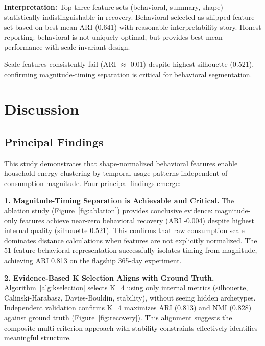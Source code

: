 \documentclass[11pt,a4paper]{article}
\begin{document}
\textbf{Interpretation:} Top three feature sets (behavioral, summary, shape) statistically indistinguishable in recovery. Behavioral selected as shipped feature set based on best mean ARI (0.641) with reasonable interpretability story. Honest reporting: behavioral is not uniquely optimal, but provides best mean performance with scale-invariant design.

Scale features consistently fail (ARI $\approx$ 0.01) despite highest silhouette (0.521), confirming magnitude-timing separation is critical for behavioral segmentation.

\section{Discussion}
\label{sec:discussion}

\subsection{Principal Findings}

This study demonstrates that shape-normalized behavioral features enable household energy clustering by temporal usage patterns independent of consumption magnitude. Four principal findings emerge:

\textbf{1. Magnitude-Timing Separation is Achievable and Critical.} The ablation study (Figure~\ref{fig:ablation}) provides conclusive evidence: magnitude-only features achieve near-zero behavioral recovery (ARI -0.004) despite highest internal quality (silhouette 0.521). This confirms that raw consumption scale dominates distance calculations when features are not explicitly normalized. The 51-feature behavioral representation successfully isolates timing from magnitude, achieving ARI 0.813 on the flagship 365-day experiment.

\textbf{2. Evidence-Based K Selection Aligns with Ground Truth.} Algorithm~\ref{alg:kselection} selects K=4 using only internal metrics (silhouette, Calinski-Harabasz, Davies-Bouldin, stability), without seeing hidden archetypes. Independent validation confirms K=4 maximizes ARI (0.813) and NMI (0.828) against ground truth (Figure~\ref{fig:recovery}). This alignment suggests the composite multi-criterion approach with stability constraints effectively identifies meaningful structure.
\end{document}
